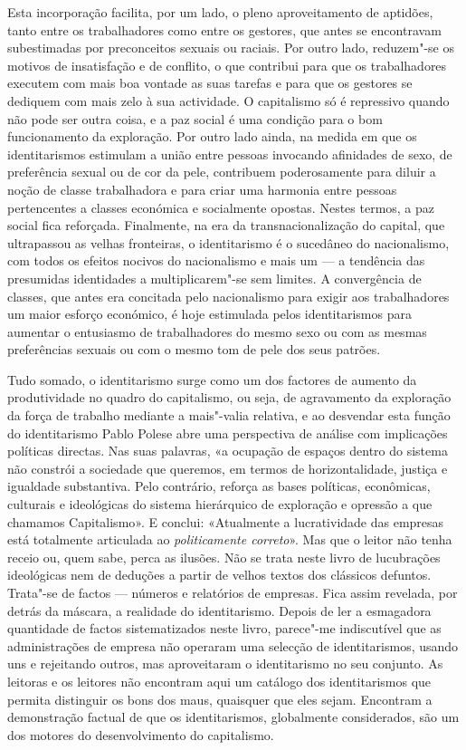 Esta incorporação facilita, por um lado, o pleno aproveitamento de
aptidões, tanto entre os trabalhadores como entre os gestores, que antes
se encontravam subestimadas por preconceitos sexuais ou raciais. Por
outro lado, reduzem"-se os motivos de insatisfação e de conflito, o que
contribui para que os trabalhadores executem com mais boa vontade as
suas tarefas e para que os gestores se dediquem com mais zelo à sua
actividade. O capitalismo só é repressivo quando não pode ser outra
coisa, e a paz social é uma condição para o bom funcionamento da
exploração. Por outro lado ainda, na medida em que os identitarismos
estimulam a união entre pessoas invocando afinidades de sexo, de
preferência sexual ou de cor da pele, contribuem poderosamente para
diluir a noção de classe trabalhadora e para criar uma harmonia entre
pessoas pertencentes a classes económica e socialmente opostas. Nestes
termos, a paz social fica reforçada. Finalmente, na era da
transnacionalização do capital, que ultrapassou as velhas fronteiras, o
identitarismo é o sucedâneo do nacionalismo, com todos os efeitos
nocivos do nacionalismo e mais um --- a tendência das presumidas
identidades a multiplicarem"-se sem limites. A convergência de classes,
que antes era concitada pelo nacionalismo para exigir aos trabalhadores
um maior esforço económico, é hoje estimulada pelos identitarismos para
aumentar o entusiasmo de trabalhadores do mesmo sexo ou com as mesmas
preferências sexuais ou com o mesmo tom de pele dos seus patrões.

Tudo somado, o identitarismo surge como um dos factores de aumento da
produtividade no quadro do capitalismo, ou seja, de agravamento da
exploração da força de trabalho mediante a mais"-valia relativa, e ao
desvendar esta função do identitarismo Pablo Polese abre uma perspectiva
de análise com implicações políticas directas. Nas suas palavras, «a
ocupação de espaços dentro do sistema não constrói a sociedade que
queremos, em termos de horizontalidade, justiça e igualdade substantiva.
Pelo contrário, reforça as bases políticas, econômicas, culturais e
ideológicas do sistema hierárquico de exploração e opressão a que
chamamos Capitalismo». E conclui: «Atualmente a lucratividade das
empresas está totalmente articulada ao \emph{politicamente correto}».
Mas que o leitor não tenha receio ou, quem sabe, perca as ilusões. Não
se trata neste livro de lucubrações ideológicas nem de deduções a partir
de velhos textos dos clássicos defuntos. Trata"-se de factos --- números
e relatórios de empresas. Fica assim revelada, por detrás da máscara, a
realidade do identitarismo. Depois de ler a esmagadora quantidade de
factos sistematizados neste livro, parece"-me indiscutível que as
administrações de empresa não operaram uma selecção de identitarismos,
usando uns e rejeitando outros, mas aproveitaram o identitarismo no seu
conjunto. As leitoras e os leitores não encontram aqui um catálogo dos
identitarismos que permita distinguir os bons dos maus, quaisquer que
eles sejam. Encontram a demonstração factual de que os identitarismos,
globalmente considerados, são um dos motores do desenvolvimento do
capitalismo.

